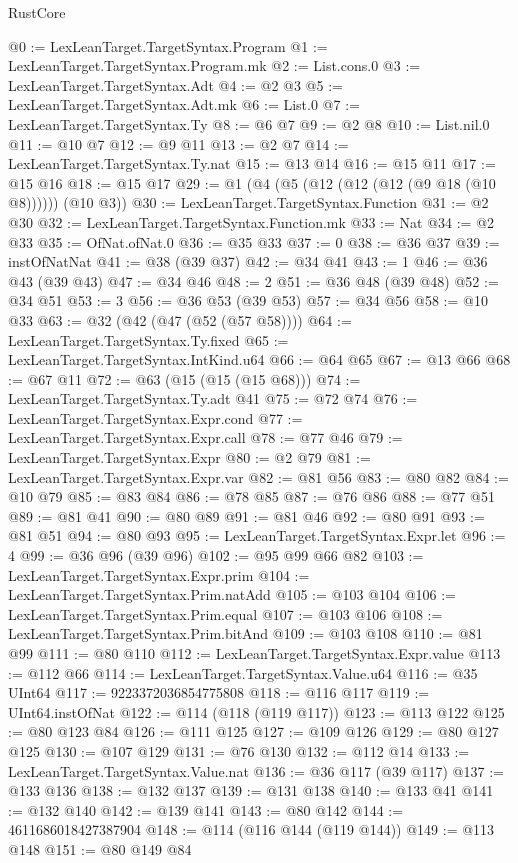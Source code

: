 \begin{lexlean}{RustCore}
\begin{coremodule}
@0 := LexLeanTarget.TargetSyntax.Program
@1 := LexLeanTarget.TargetSyntax.Program.mk
@2 := List.cons.{0}
@3 := LexLeanTarget.TargetSyntax.Adt
@4 := @2 @3
@5 := LexLeanTarget.TargetSyntax.Adt.mk
@6 := List.{0}
@7 := LexLeanTarget.TargetSyntax.Ty
@8 := @6 @7
@9 := @2 @8
@10 := List.nil.{0}
@11 := @10 @7
@12 := @9 @11
@13 := @2 @7
@14 := LexLeanTarget.TargetSyntax.Ty.nat
@15 := @13 @14
@16 := @15 @11
@17 := @15 @16
@18 := @15 @17
@29 := @1 (@4 (@5 (@12 (@12 (@12 (@9 @18 (@10 @8)))))) (@10 @3))
@30 := LexLeanTarget.TargetSyntax.Function
@31 := @2 @30
@32 := LexLeanTarget.TargetSyntax.Function.mk
@33 := Nat
@34 := @2 @33
@35 := OfNat.ofNat.{0}
@36 := @35 @33
@37 := 0
@38 := @36 @37
@39 := instOfNatNat
@41 := @38 (@39 @37)
@42 := @34 @41
@43 := 1
@46 := @36 @43 (@39 @43)
@47 := @34 @46
@48 := 2
@51 := @36 @48 (@39 @48)
@52 := @34 @51
@53 := 3
@56 := @36 @53 (@39 @53)
@57 := @34 @56
@58 := @10 @33
@63 := @32 (@42 (@47 (@52 (@57 @58))))
@64 := LexLeanTarget.TargetSyntax.Ty.fixed
@65 := LexLeanTarget.TargetSyntax.IntKind.u64
@66 := @64 @65
@67 := @13 @66
@68 := @67 @11
@72 := @63 (@15 (@15 (@15 @68)))
@74 := LexLeanTarget.TargetSyntax.Ty.adt @41
@75 := @72 @74
@76 := LexLeanTarget.TargetSyntax.Expr.cond
@77 := LexLeanTarget.TargetSyntax.Expr.call
@78 := @77 @46
@79 := LexLeanTarget.TargetSyntax.Expr
@80 := @2 @79
@81 := LexLeanTarget.TargetSyntax.Expr.var
@82 := @81 @56
@83 := @80 @82
@84 := @10 @79
@85 := @83 @84
@86 := @78 @85
@87 := @76 @86
@88 := @77 @51
@89 := @81 @41
@90 := @80 @89
@91 := @81 @46
@92 := @80 @91
@93 := @81 @51
@94 := @80 @93
@95 := LexLeanTarget.TargetSyntax.Expr.let
@96 := 4
@99 := @36 @96 (@39 @96)
@102 := @95 @99 @66 @82
@103 := LexLeanTarget.TargetSyntax.Expr.prim
@104 := LexLeanTarget.TargetSyntax.Prim.natAdd
@105 := @103 @104
@106 := LexLeanTarget.TargetSyntax.Prim.equal
@107 := @103 @106
@108 := LexLeanTarget.TargetSyntax.Prim.bitAnd
@109 := @103 @108
@110 := @81 @99
@111 := @80 @110
@112 := LexLeanTarget.TargetSyntax.Expr.value
@113 := @112 @66
@114 := LexLeanTarget.TargetSyntax.Value.u64
@116 := @35 UInt64
@117 := 9223372036854775808
@118 := @116 @117
@119 := UInt64.instOfNat
@122 := @114 (@118 (@119 @117))
@123 := @113 @122
@125 := @80 @123 @84
@126 := @111 @125
@127 := @109 @126
@129 := @80 @127 @125
@130 := @107 @129
@131 := @76 @130
@132 := @112 @14
@133 := LexLeanTarget.TargetSyntax.Value.nat
@136 := @36 @117 (@39 @117)
@137 := @133 @136
@138 := @132 @137
@139 := @131 @138
@140 := @133 @41
@141 := @132 @140
@142 := @139 @141
@143 := @80 @142
@144 := 4611686018427387904
@148 := @114 (@116 @144 (@119 @144))
@149 := @113 @148
@151 := @80 @149 @84

\end{coremodule}
\end{lexlean}
